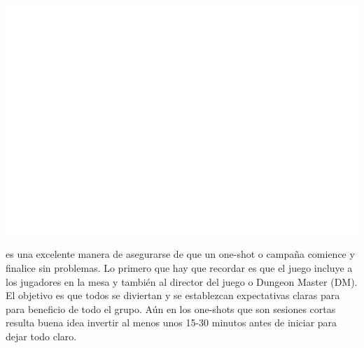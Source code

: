 \documentclass[10pt,twoside,twocolumn,openany]{dndbook}
\begin{document}

\begin{strip}
  \centering
  \includegraphics[width=\textwidth]{media/invisible.png}
\end{strip}

 es una excelente manera de asegurarse de que un one-shot o campaña comience y 
finalice sin problemas. Lo primero que hay que recordar es que el juego incluye a los jugadores 
en la mesa y también al director del juego o Dungeon Master (DM). El objetivo es que todos se 
diviertan y se establezcan expectativas claras para para beneficio de todo el grupo. Aún en los 
one-shots que son sesiones cortas resulta buena idea invertir al menos unos 15-30 minutos antes de 
iniciar para dejar todo claro.
\end{document}
